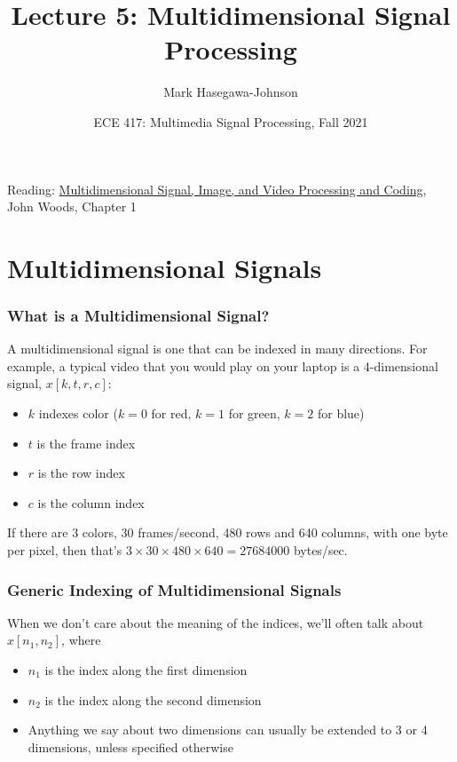\documentclass{beamer}
\title{Lecture 5: Multidimensional Signal Processing}
\author{Mark Hasegawa-Johnson}
\date{ECE 417: Multimedia Signal Processing, Fall 2021}
\begin{document}
\begin{frame}
  \maketitle
\end{frame}

\begin{frame}
Reading: \href{https://www.google.com/books/edition/Multidimensional_Signal_Image_and_Video/0lJ0atc5X-UC?hl=en&gbpv=1&dq=multidimensional+signal+processing+tutorial&pg=PP1&printsec=frontcover}{\color{blue}Multidimensional Signal, Image, and Video Processing and Coding}, John Woods, Chapter 1
\end{frame}

\begin{frame}
  \tableofcontents
\end{frame}


\section[Signals]{Multidimensional Signals}
\setcounter{subsection}{1}

\begin{frame}
  \frametitle{What is a Multidimensional Signal?}

  A multidimensional signal is one that can be indexed in many
  directions.  For example, a typical video that you would play on
  your laptop is a 4-dimensional signal, $x[k,t,r,c]$:
  \begin{itemize}
  \item $k$ indexes color ($k=0$ for red, $k=1$ for green, $k=2$ for blue)
  \item $t$ is the frame index
  \item $r$ is the row index
  \item $c$ is the column index
  \end{itemize}
  If there are 3 colors, 30 frames/second, 480 rows and 640 columns,
  with one byte per pixel, then that's $3\times 30\times 480\times
  640=27684000$ bytes/sec.
\end{frame}
  
\begin{frame}
  \frametitle{Generic Indexing of Multidimensional Signals}

  When we don't care about the meaning of the indices, we'll often
  talk about $x[n_1,n_2]$, where
  \begin{itemize}
  \item $n_1$ is the index along the first dimension
  \item $n_2$ is the index along the second dimension
  \item Anything we say about two dimensions can usually be extended
    to 3 or 4 dimensions, unless specified otherwise
  \end{itemize}
\end{frame}
\end{document}
